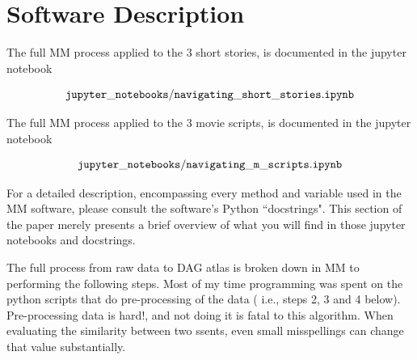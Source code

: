 \documentclass[12pt]{article}
\begin{document}
 

\section{Software Description}

The full MM process applied to the 3 short stories,
is documented in the jupyter notebook

$$\tt jupyter\_notebooks/navigating\_short\_stories.ipynb$$

The full MM process applied to the 3 movie scripts,
is documented in the jupyter notebook

$$\tt jupyter\_notebooks/navigating\_m\_scripts.ipynb$$

For a detailed description, encompassing 
every method and variable used in the
MM software,
please consult the software's Python ``docstrings".
This section of the paper merely
presents a brief overview of what you
will find in those jupyter notebooks and docstrings.

The full process from raw data to DAG atlas
is broken down in MM to
performing the following steps. 
Most of my time programming
was spent on the python scripts that do
pre-processing of the data (
i.e., steps 2, 3 and 4 below).
Pre-processing data is hard!,
and not doing it is fatal
to this algorithm. When 
evaluating the similarity between
two ssents,
even small misspellings can 
change that value substantially.
 
\end{document}
